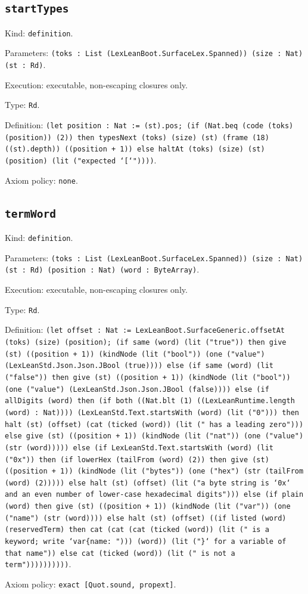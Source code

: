 \documentclass[11pt]{article}
\begin{document}
\subsection*{\texttt{startTypes}}
\noindent Kind: \texttt{definition}.\par
\noindent Parameters: \texttt{(toks : List (LexLeanBoot.SurfaceLex.Spanned)) (size : Nat) (st : Rd)}.\par
\noindent Execution: executable, non-escaping closures only.\par
\noindent Type: \texttt{Rd}.\par
\noindent Definition: \texttt{(let position : Nat := (st).pos; (if (Nat.beq (code (toks) (position)) (2)) then typesNext (toks) (size) (st) (frame (18) ((st).depth)) ((position + 1)) else haltAt (toks) (size) (st) (position) (lit ("expected `[`"))))}.\par
\noindent Axiom policy: \texttt{none}.\par
\subsection*{\texttt{termWord}}
\noindent Kind: \texttt{definition}.\par
\noindent Parameters: \texttt{(toks : List (LexLeanBoot.SurfaceLex.Spanned)) (size : Nat) (st : Rd) (position : Nat) (word : ByteArray)}.\par
\noindent Execution: executable, non-escaping closures only.\par
\noindent Type: \texttt{Rd}.\par
\noindent Definition: \texttt{(let offset : Nat := LexLeanBoot.SurfaceGeneric.offsetAt (toks) (size) (position); (if same (word) (lit ("true")) then give (st) ((position + 1)) (kindNode (lit ("bool")) (one ("value") (LexLeanStd.Json.Json.JBool (true)))) else (if same (word) (lit ("false")) then give (st) ((position + 1)) (kindNode (lit ("bool")) (one ("value") (LexLeanStd.Json.Json.JBool (false)))) else (if allDigits (word) then (if both ((Nat.blt (1) ((LexLeanRuntime.length (word) : Nat)))) (LexLeanStd.Text.startsWith (word) (lit ("0"))) then halt (st) (offset) (cat (ticked (word)) (lit (" has a leading zero"))) else give (st) ((position + 1)) (kindNode (lit ("nat")) (one ("value") (str (word))))) else (if LexLeanStd.Text.startsWith (word) (lit ("0x")) then (if lowerHex (tailFrom (word) (2)) then give (st) ((position + 1)) (kindNode (lit ("bytes")) (one ("hex") (str (tailFrom (word) (2))))) else halt (st) (offset) (lit ("a byte string is `0x` and an even number of lower-case hexadecimal digits"))) else (if plain (word) then give (st) ((position + 1)) (kindNode (lit ("var")) (one ("name") (str (word)))) else halt (st) (offset) ((if listed (word) (reservedTerm) then cat (cat (cat (ticked (word)) (lit (" is a keyword; write `var\{name: "))) (word)) (lit ("\}` for a variable of that name")) else cat (ticked (word)) (lit (" is not a term"))))))))))}.\par
\noindent Axiom policy: \texttt{exact [Quot.sound, propext]}.\par
\end{document}
